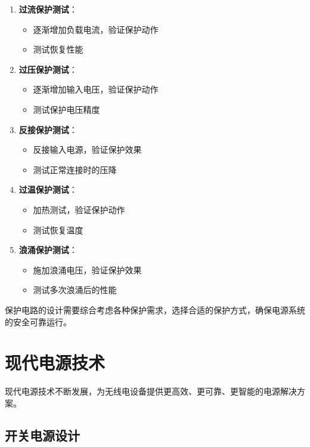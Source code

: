 \documentclass[12pt,UTF8]{ctexbook}
\begin{document}
\begin{enumerate}
    \item \textbf{过流保护测试}：
    \begin{itemize}
        \item 逐渐增加负载电流，验证保护动作
        \item 测试恢复性能
    \end{itemize}
    
    \item \textbf{过压保护测试}：
    \begin{itemize}
        \item 逐渐增加输入电压，验证保护动作
        \item 测试保护电压精度
    \end{itemize}
    
    \item \textbf{反接保护测试}：
    \begin{itemize}
        \item 反接输入电源，验证保护效果
        \item 测试正常连接时的压降
    \end{itemize}
    
    \item \textbf{过温保护测试}：
    \begin{itemize}
        \item 加热测试，验证保护动作
        \item 测试恢复温度
    \end{itemize}
    
    \item \textbf{浪涌保护测试}：
    \begin{itemize}
        \item 施加浪涌电压，验证保护效果
        \item 测试多次浪涌后的性能
    \end{itemize}
\end{enumerate}

保护电路的设计需要综合考虑各种保护需求，选择合适的保护方式，确保电源系统的安全可靠运行。

\section{现代电源技术}

现代电源技术不断发展，为无线电设备提供更高效、更可靠、更智能的电源解决方案。

\subsection{开关电源设计}
\end{document}
